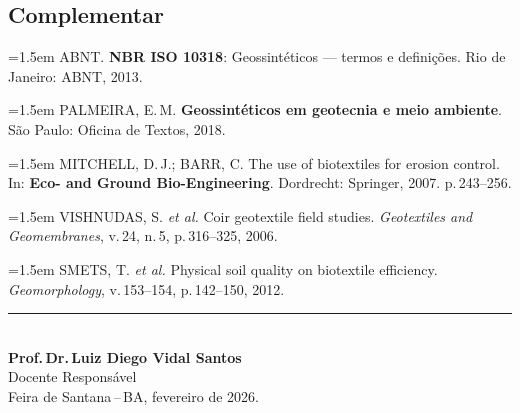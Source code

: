 \documentclass[11pt,a4paper]{article}
\begin{document}
\subsection*{Complementar}

\begin{small}
\hangindent=1.5em
ABNT. \textbf{NBR ISO 10318}: Geossintéticos --- termos e definições. Rio de Janeiro: ABNT, 2013.\par\medskip

\hangindent=1.5em
PALMEIRA, E.\,M. \textbf{Geossintéticos em geotecnia e meio ambiente}. São Paulo: Oficina de Textos, 2018.\par\medskip

\hangindent=1.5em
MITCHELL, D.\,J.; BARR, C. The use of biotextiles for erosion control. In: \textbf{Eco- and Ground Bio-Engineering}. Dordrecht: Springer, 2007. p.\,243--256.\par\medskip

\hangindent=1.5em
VISHNUDAS, S. \textit{et al.} Coir geotextile field studies. \textit{Geotextiles and Geomembranes}, v.\,24, n.\,5, p.\,316--325, 2006.\par\medskip

\hangindent=1.5em
SMETS, T. \textit{et al.} Physical soil quality on biotextile efficiency. \textit{Geomorphology}, v.\,153--154, p.\,142--150, 2012.\par\medskip
\end{small}



\vfill

\begin{center}
\noindent\rule{6cm}{0.4pt}\\[6pt]
\textbf{Prof.\,Dr.\,Luiz Diego Vidal Santos}\\
Docente Responsável\\[4pt]
{\small Feira de Santana\,--\,BA, fevereiro de 2026.}
\end{center}
\end{document}
